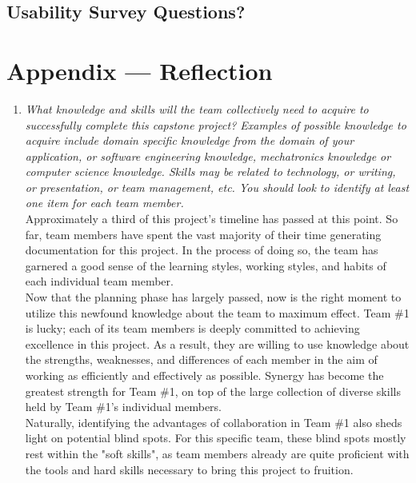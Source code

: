\documentclass[12pt, titlepage]{article}
\begin{document}
\subsection{Usability Survey Questions?}


\newpage{}
\section*{Appendix --- Reflection}

\begin{enumerate}
  \item \textit{What knowledge and skills will the team collectively need to acquire to
        successfully complete this capstone project?  Examples of possible knowledge
        to acquire include domain specific knowledge from the domain of your
        application, or software engineering knowledge, mechatronics knowledge or
        computer science knowledge.  Skills may be related to technology, or writing,
        or presentation, or team management, etc.  You should look to identify at
        least one item for each team member.}\\

	Approximately a third of this project's timeline has passed at this point. So far, team members have spent the vast majority of their time generating documentation for this project. In the process of doing so, the team has garnered a good sense of the learning styles, working styles, and habits of each individual team member.\\

Now that the planning phase has largely passed, now is the right moment to utilize this newfound knowledge about the team to maximum effect. Team \#1 is lucky; each of its team members is deeply committed to achieving excellence in this project. As a result, they are willing to use knowledge about the strengths, weaknesses, and differences of each member in the aim of working as efficiently and effectively as possible. Synergy has become the greatest strength for Team \#1, on top of the large collection of diverse skills held by Team \#1's individual members.\\

Naturally, identifying the advantages of collaboration in Team \#1 also sheds light on potential blind spots. For this specific team, these blind spots mostly rest within the "soft skills", as team members already are quite proficient with the tools and hard skills necessary to bring this project to fruition.\\


\end{enumerate}
\end{document}
